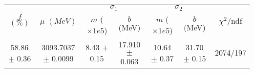 \begin{tabular}{c|c|cc|cc||c}
 \multirow{2}{*}{$f$ $(\%)$} & \multirow{2}{*}{$\mu$ $(MeV)$} & \multicolumn{2}{|c|}{$\sigma_1$} & \multicolumn{2}{|c||}{$\sigma_2$} & \multirow{2}{*}{$\chi^2/$ndf} \\
 & & $m$ ($\times1e5$) & $b$ (MeV) & $m$ ($\times1e5$) & $b$ (MeV) & \\
\hline
58.86 $\pm$ 0.36 & 3093.7037 $\pm$ 0.0099 & 8.43 $\pm$ 0.15 & 17.910 $\pm$ 0.063 & 10.64 $\pm$ 0.37 & 31.70 $\pm$ 0.15 & 2074/197\\
\end{tabular}
